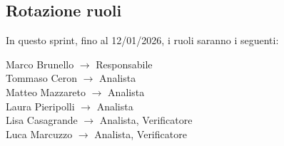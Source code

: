 \subsection{Rotazione ruoli}
In questo sprint, fino al 12/01/2026, i ruoli saranno i seguenti: \\
\begin{center}
	Marco Brunello $\rightarrow$ Responsabile \\
	Tommaso Ceron $\rightarrow$ Analista \\
	Matteo Mazzareto $\rightarrow$ Analista \\
	Laura Pieripolli $\rightarrow$ Analista\\
	Lisa Casagrande $\rightarrow$ Analista, Verificatore \\
	Luca Marcuzzo $\rightarrow$ Analista, Verificatore \\
\end{center}
